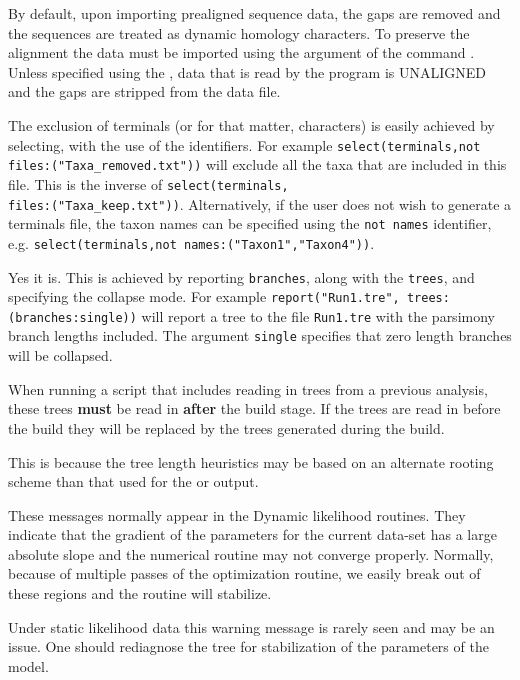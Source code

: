 {By default, upon importing prealigned sequence data, the gaps are
removed and the sequences are treated as dynamic homology characters.
To preserve the alignment the data must be imported using the
 argument of the command .
Unless specified using the , data that is
read by the program is UNALIGNED and the gaps are stripped from the
data file.}

{The exclusion of terminals (or for that matter, characters) is easily
achieved by selecting, with the use of the identifiers.  For example
\texttt{select(terminals,not files:("Taxa\_removed.txt"))} will exclude all the 
taxa that are included in this file.  This is the inverse of 
\texttt{select(terminals,\\ files:("Taxa\_keep.txt"))}. Alternatively, if the user does not wish 
to generate a terminals file, the taxon names can be specified using
the \texttt{not names} identifier, 
e.g. \texttt{select(terminals,not names:("Taxon1","Taxon4"))}.}

{Yes it is. This is achieved by reporting \texttt{branches}, along with 
the \texttt{trees}, and specifying the collapse mode. For example
\texttt{report("Run1.tre", trees:(branches:single))} will report a
tree to the file \texttt{Run1.tre} with the parsimony branch lengths 
included.  The argument \texttt{single} specifies that zero length
branches will be collapsed.}

{When running a script that includes reading in trees from a previous analysis,
these trees {\bf must} be read in {\bf after} the build stage.  If
the trees are read in before the build they will be replaced by the
trees generated during the build.}

{This is because the tree length heuristics may be based on an
alternate rooting scheme than that used for the 
or  output.}

{These messages normally appear in the Dynamic likelihood routines. 
They indicate that the gradient
of the parameters for the current data-set has a large absolute
slope and the numerical routine may not converge properly. Normally,
because of multiple passes of the optimization routine, we easily
break out of these regions and the routine will stabilize.

Under static likelihood data this warning message is rarely seen
and may be an issue. One should rediagnose the tree for stabilization
of the parameters of the model.}

